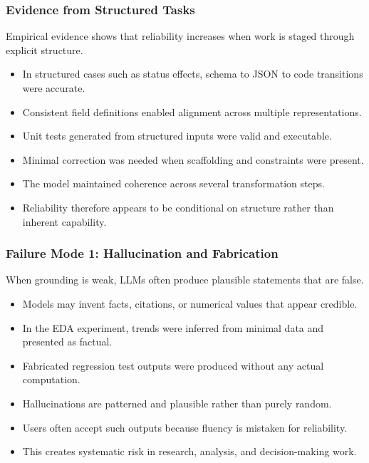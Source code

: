 \documentclass{beamer}
\begin{document}
\frame
{
   \frametitle{Evidence from Structured Tasks}

    Empirical evidence shows that reliability increases when work is staged through explicit structure.

    \begin{itemize}
        \item In structured cases such as status effects, schema to JSON to code transitions were accurate.
        \item Consistent field definitions enabled alignment across multiple representations.
        \item Unit tests generated from structured inputs were valid and executable.
        \item Minimal correction was needed when scaffolding and constraints were present.
        \item The model maintained coherence across several transformation steps.
        \item Reliability therefore appears to be conditional on structure rather than inherent capability.
    \end{itemize}
}

\frame
{
   \frametitle{Failure Mode 1: Hallucination and Fabrication}

    When grounding is weak, LLMs often produce plausible statements that are false.

    \begin{itemize}
        \item Models may invent facts, citations, or numerical values that appear credible.
        \item In the EDA experiment, trends were inferred from minimal data and presented as factual.
        \item Fabricated regression test outputs were produced without any actual computation.
        \item Hallucinations are patterned and plausible rather than purely random.
        \item Users often accept such outputs because fluency is mistaken for reliability.
        \item This creates systematic risk in research, analysis, and decision-making work.
    \end{itemize}
}
\end{document}
